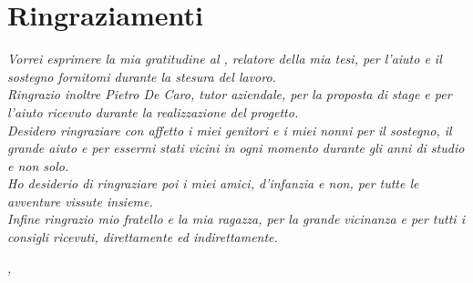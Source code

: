 
\cleardoublepage
{}
{}



\bigskip

\begingroup
\let\clearpage\relax
\let\cleardoublepage\relax
\let\cleardoublepage\relax

\chapter*{Ringraziamenti}

\noindent \textit{Vorrei esprimere la mia gratitudine al \profTitle{ }\myProf, relatore della mia tesi, per l'aiuto e il sostegno fornitomi durante la stesura del lavoro.}\\

\noindent \textit{Ringrazio inoltre Pietro De Caro, tutor aziendale, per la proposta di stage e per l'aiuto ricevuto durante la realizzazione del progetto.}\\

\noindent \textit{Desidero ringraziare con affetto i miei genitori e i miei nonni per il sostegno, il grande aiuto e per essermi stati vicini in ogni momento durante gli anni di studio e non solo.}\\

\noindent \textit{Ho desiderio di ringraziare poi i miei amici, d'infanzia e non, per tutte le avventure vissute insieme.}\\

\noindent \textit{Infine ringrazio mio fratello e la mia ragazza, per la grande vicinanza e per tutti i consigli ricevuti, direttamente ed indirettamente.}\\
\bigskip

\noindent\textit{\myLocation, \myTime}
\hfill \myName

\endgroup

